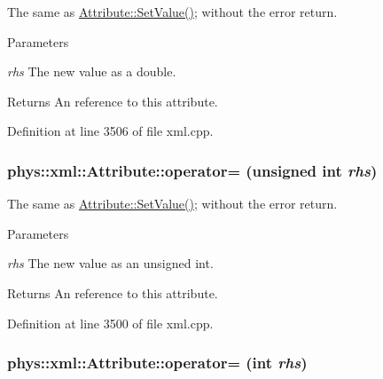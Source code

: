 The same as \hyperlink{classphys_1_1xml_1_1Attribute_a470512fcd8b4f7609319bf85df100aaa}{Attribute::SetValue()}; without the error return. 


\begin{DoxyParams}{Parameters}
\item[{\em rhs}]The new value as a double. \end{DoxyParams}
\begin{DoxyReturn}{Returns}
An reference to this attribute. 
\end{DoxyReturn}


Definition at line 3506 of file xml.cpp.

\hypertarget{classphys_1_1xml_1_1Attribute_af6b6e5202b23be948b986cb0bcdf5da8}{
\subsubsection[{operator=}]{\setlength{\rightskip}{0pt plus 5cm}phys::xml::Attribute::operator= (unsigned int {\em rhs})}}
\label{da/ddf/classphys_1_1xml_1_1Attribute_af6b6e5202b23be948b986cb0bcdf5da8}


The same as \hyperlink{classphys_1_1xml_1_1Attribute_a470512fcd8b4f7609319bf85df100aaa}{Attribute::SetValue()}; without the error return. 


\begin{DoxyParams}{Parameters}
\item[{\em rhs}]The new value as an unsigned int. \end{DoxyParams}
\begin{DoxyReturn}{Returns}
An reference to this attribute. 
\end{DoxyReturn}


Definition at line 3500 of file xml.cpp.

\hypertarget{classphys_1_1xml_1_1Attribute_ac9a18c2b6c4bfc0cdfe4eede938a91fe}{
\subsubsection[{operator=}]{\setlength{\rightskip}{0pt plus 5cm}phys::xml::Attribute::operator= (int {\em rhs})}}
\label{da/ddf/classphys_1_1xml_1_1Attribute_ac9a18c2b6c4bfc0cdfe4eede938a91fe}


